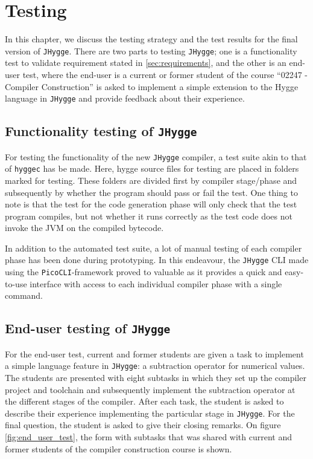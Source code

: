 \chapter{Testing}\label{sec:testing}

In this chapter, we discuss the testing strategy and the test results for the final version of \texttt{JHygge}.
There are two parts to testing \texttt{JHygge}; one is a functionality test to validate requirement stated in \ref{sec:requirements},
and the other is an end-user test, where the end-user is a current or former student of the course ``02247 - Compiler Construction''
is asked to implement a simple extension to the Hygge language in \texttt{JHygge} and provide feedback about their experience.

\section{Functionality testing of \texttt{JHygge}}

For testing the functionality of the new \texttt{JHygge} compiler, a test suite akin to that of \texttt{hyggec} has be made.
Here, hygge source files for testing are placed in folders marked for testing. These folders are divided first by compiler
stage/phase and subsequently by whether the program should pass or fail the test. One thing to note is that the test
for the code generation phase will only check that the test program compiles, but not whether it runs correctly as the
test code does not invoke the JVM on the compiled bytecode.

In addition to the automated test suite, a lot of manual testing of each compiler phase has been done during prototyping.
In this endeavour, the \texttt{JHygge} CLI made using the \texttt{PicoCLI}-framework\cite{picocli} proved to valuable as it provides a
quick and easy-to-use interface with access to each individual compiler phase with a single command.

\section{End-user testing of \texttt{JHygge}}

For the end-user test, current and former students are given a task to implement a simple language feature in \texttt{JHygge}:
a subtraction operator for numerical values. The students are presented with eight subtasks in which they set up the compiler
project and toolchain and subsequently implement the subtraction operator at the different stages of the compiler. After
each task, the student is asked to describe their experience implementing the particular stage in \texttt{JHygge}. For the
final question, the student is asked to give their closing remarks. On figure \ref{fig:end_user_test}, the form with subtasks
that was shared with current and former students of the compiler construction course is shown.

